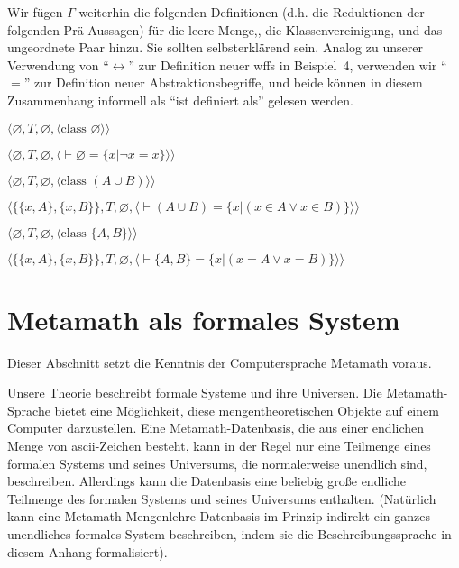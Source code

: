 Wir fügen $\Gamma$ weiterhin die folgenden Definitionen (d.h. die Reduktionen der folgenden Prä-Aussagen) für die leere Menge,, die Klassenvereinigung, und das ungeordnete Paar hinzu.  Sie sollten selbsterklärend sein.  Analog zu unserer Verwendung von "`$\leftrightarrow$"' zur Definition neuer wffs in Beispiel~4, verwenden wir "`$=$"' zur Definition neuer Abstraktionsbegriffe, und beide können in diesem Zusammenhang informell als "`ist definiert als"' gelesen werden.
\begin{list}{}{\itemsep 0.0pt}
      \item[] $\langle\varnothing,T,\varnothing,
               \langle \mbox{class\ }\varnothing\rangle\rangle$
      \item[] $\langle\varnothing,T,\varnothing,
               \langle \vdash \varnothing = \{ x | \lnot x = x \}
               \rangle\rangle$
      \item[] $\langle\varnothing,T,\varnothing,
               \langle \mbox{class\ }(A\cup B)\rangle\rangle$
      \item[] $\langle\{\{x,A\},\{x,B\}\},T,\varnothing,
               \langle \vdash ( A \cup B ) = \{ x | ( x \in A \vee x \in B ) \}
               \rangle\rangle$
      \item[] $\langle\varnothing,T,\varnothing,
               \langle \mbox{class\ }\{A,B\}\rangle\rangle$
      \item[] $\langle\{\{x,A\},\{x,B\}\},T,\varnothing,
               \langle \vdash \{ A , B \} = \{ x | ( x = A \vee x = B ) \}
               \rangle\rangle$
\end{list}

\section{Metamath als formales System}\label{theorymm}

Dieser Abschnitt setzt die Kenntnis der Computersprache Metamath voraus.

Unsere Theorie beschreibt formale Systeme und ihre Universen.  Die Metamath-Sprache bietet eine Möglichkeit, diese mengentheoretischen Objekte auf einem Computer darzustellen.  Eine Metamath-Datenbasis, die aus einer endlichen Menge von {\sc ascii}-Zeichen besteht, kann in der Regel nur eine Teilmenge eines formalen Systems und seines Universums, die normalerweise unendlich sind, beschreiben.  Allerdings kann die Datenbasis eine beliebig große endliche Teilmenge des formalen Systems und seines Universums enthalten.  (Natürlich kann eine Metamath-Mengenlehre-Datenbasis im Prinzip indirekt ein ganzes unendliches formales System beschreiben, indem sie die Beschreibungssprache in diesem Anhang formalisiert).

